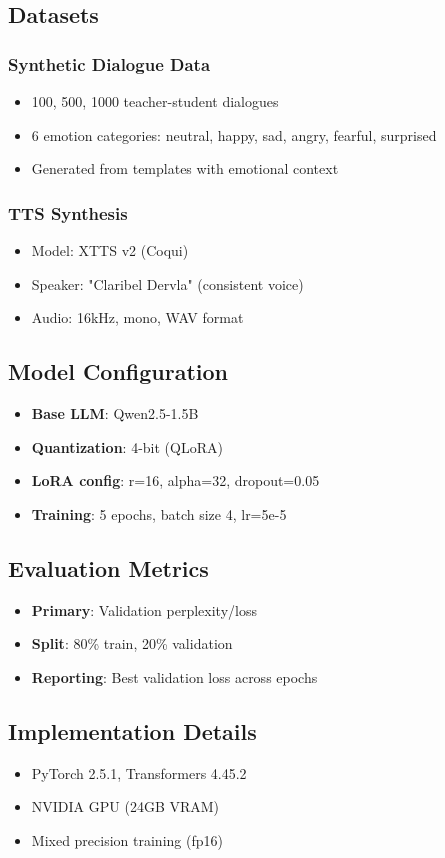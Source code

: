 
\subsection{Datasets}
\subsubsection{Synthetic Dialogue Data}
\begin{itemize}
    \item 100, 500, 1000 teacher-student dialogues
    \item 6 emotion categories: neutral, happy, sad, angry, fearful, surprised
    \item Generated from templates with emotional context
\end{itemize}

\subsubsection{TTS Synthesis}
\begin{itemize}
    \item Model: XTTS v2 (Coqui)
    \item Speaker: "Claribel Dervla" (consistent voice)
    \item Audio: 16kHz, mono, WAV format
\end{itemize}

\subsection{Model Configuration}
\begin{itemize}
    \item \textbf{Base LLM}: Qwen2.5-1.5B
    \item \textbf{Quantization}: 4-bit (QLoRA)
    \item \textbf{LoRA config}: r=16, alpha=32, dropout=0.05
    \item \textbf{Training}: 5 epochs, batch size 4, lr=5e-5
\end{itemize}

\subsection{Evaluation Metrics}
\begin{itemize}
    \item \textbf{Primary}: Validation perplexity/loss
    \item \textbf{Split}: 80\% train, 20\% validation
    \item \textbf{Reporting}: Best validation loss across epochs
\end{itemize}

\subsection{Implementation Details}
\begin{itemize}
    \item PyTorch 2.5.1, Transformers 4.45.2
    \item NVIDIA GPU (24GB VRAM)
    \item Mixed precision training (fp16)
\end{itemize}
